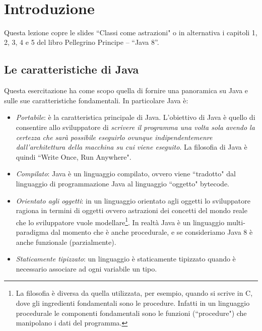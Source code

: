 \documentclass{article}
\title{
	\vspace{2in}
	\textmd{\textbf{\hmwkClass\\ \vspace{1cm} \hmwkTitle \vspace{1cm}}}\\
	\normalsize\vspace{0.1in}\small{\hmwkDueDate}\\
	\vspace{0.1in}\large{\textit{\hmwkClassInstructor\ \hmwkClassTime}}
	\vspace{3in}
}
\author{\textbf{\hmwkAuthorName}}
\date{} %
\theoremstyle{definition}
\begin{document}
\maketitle



\newpage
\tableofcontents
\newpage



\section{Introduzione}
Questa lezione copre le  slides ``Classi come astrazioni" o in alternativa i capitoli  1, 2, 3, 4 e 5 del libro  Pellegrino Principe -- “Java 8”.


\subsection{Le caratteristiche di Java}
Questa esercitazione ha come scopo quella di fornire una panoramica su Java e sulle sue caratteristiche fondamentali. In particolare Java \`e:
\begin{itemize}
\item \emph{Portabile}: \`e la caratteristica principale di Java. L'obiettivo di Java \`e quello di consentire allo sviluppatore di  \emph{scrivere il programma una volta sola avendo la certezza che sar\`a possibile eseguirlo ovunque indipendentemenre dall'architettura della macchina su cui viene eseguito}. La filosofia di Java \`e quindi ``Write Once, Run Anywhere".
\item \emph{Compilato}: Java \`e un linguaggio compilato, ovvero viene ``tradotto" dal linguaggio di programmazione Java al linguaggio ``oggetto" bytecode. 
\item \emph{Orientato agli oggetti}: in un linguaggio orientato agli oggetti lo sviluppatore ragiona in termini di oggetti ovvero astrazioni dei concetti del mondo reale che lo sviluppatore vuole modellare\footnote{La filosofia \`e diversa da quella utilizzata, per esempio, quando si scrive in C, dove gli ingredienti fondamentali sono le procedure. Infatti in un linguaggio procedurale le componenti fondamentali sono le funzioni (``procedure") che manipolano i dati del programma.}. In realt\`a Java \`e un linguaggio multi-paradigma dal momento che \`e anche procedurale, e se consideriamo Java 8 \`e anche funzionale (parzialmente).
\item \emph{Staticamente tipizzato}: un linguaggio \`e staticamente tipizzato quando \`e necessario associare ad ogni variabile un tipo.
\end{itemize}
\end{document}
